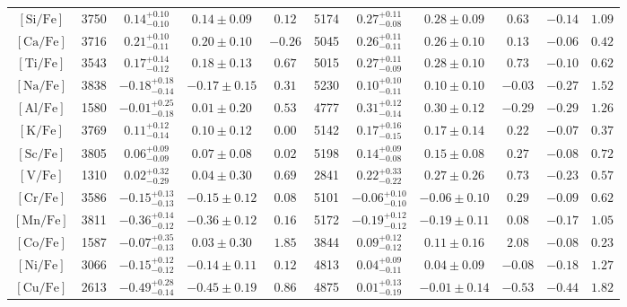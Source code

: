\begin{table*}
\begin{tabular}{c|cccc|cccc|cc}
$\mathrm{[Si/Fe]}$ & 3750 & $0.14_{-0.10}^{+0.10}$ & $0.14 \pm 0.09$ & $0.12$ & 5174 & $0.27_{-0.08}^{+0.11}$ & $0.28 \pm 0.09$ & $0.63$ & $-0.14$ & $1.09$  \\
$\mathrm{[Ca/Fe]}$ & 3716 & $0.21_{-0.11}^{+0.10}$ & $0.20 \pm 0.10$ & $-0.26$ & 5045 & $0.26_{-0.11}^{+0.11}$ & $0.26 \pm 0.10$ & $0.13$ & $-0.06$ & $0.42$  \\
$\mathrm{[Ti/Fe]}$ & 3543 & $0.17_{-0.12}^{+0.14}$ & $0.18 \pm 0.13$ & $0.67$ & 5015 & $0.27_{-0.09}^{+0.11}$ & $0.28 \pm 0.10$ & $0.73$ & $-0.10$ & $0.62$  \\
\hline
$\mathrm{[Na/Fe]}$ & 3838 & $-0.18_{-0.14}^{+0.18}$ & $-0.17 \pm 0.15$ & $0.31$ & 5230 & $0.10_{-0.11}^{+0.10}$ & $0.10 \pm 0.10$ & $-0.03$ & $-0.27$ & $1.52$  \\
$\mathrm{[Al/Fe]}$ & 1580 & $-0.01_{-0.18}^{+0.25}$ & $0.01 \pm 0.20$ & $0.53$ & 4777 & $0.31_{-0.14}^{+0.12}$ & $0.30 \pm 0.12$ & $-0.29$ & $-0.29$ & $1.26$  \\
$\mathrm{[K/Fe]}$ & 3769 & $0.11_{-0.14}^{+0.12}$ & $0.10 \pm 0.12$ & $0.00$ & 5142 & $0.17_{-0.15}^{+0.16}$ & $0.17 \pm 0.14$ & $0.22$ & $-0.07$ & $0.37$  \\
\hline
$\mathrm{[Sc/Fe]}$ & 3805 & $0.06_{-0.09}^{+0.09}$ & $0.07 \pm 0.08$ & $0.02$ & 5198 & $0.14_{-0.08}^{+0.09}$ & $0.15 \pm 0.08$ & $0.27$ & $-0.08$ & $0.72$  \\
$\mathrm{[V/Fe]}$ & 1310 & $0.02_{-0.29}^{+0.32}$ & $0.04 \pm 0.30$ & $0.69$ & 2841 & $0.22_{-0.22}^{+0.33}$ & $0.27 \pm 0.26$ & $0.73$ & $-0.23$ & $0.57$  \\
$\mathrm{[Cr/Fe]}$ & 3586 & $-0.15_{-0.13}^{+0.13}$ & $-0.15 \pm 0.12$ & $0.08$ & 5101 & $-0.06_{-0.10}^{+0.10}$ & $-0.06 \pm 0.10$ & $0.29$ & $-0.09$ & $0.62$  \\
$\mathrm{[Mn/Fe]}$ & 3811 & $-0.36_{-0.12}^{+0.14}$ & $-0.36 \pm 0.12$ & $0.16$ & 5172 & $-0.19_{-0.12}^{+0.12}$ & $-0.19 \pm 0.11$ & $0.08$ & $-0.17$ & $1.05$  \\
$\mathrm{[Co/Fe]}$ & 1587 & $-0.07_{-0.13}^{+0.35}$ & $0.03 \pm 0.30$ & $1.85$ & 3844 & $0.09_{-0.12}^{+0.12}$ & $0.11 \pm 0.16$ & $2.08$ & $-0.08$ & $0.23$  \\
$\mathrm{[Ni/Fe]}$ & 3066 & $-0.15_{-0.12}^{+0.12}$ & $-0.14 \pm 0.11$ & $0.12$ & 4813 & $0.04_{-0.11}^{+0.09}$ & $0.04 \pm 0.09$ & $-0.08$ & $-0.18$ & $1.27$  \\
$\mathrm{[Cu/Fe]}$ & 2613 & $-0.49_{-0.14}^{+0.28}$ & $-0.45 \pm 0.19$ & $0.86$ & 4875 & $0.01_{-0.19}^{+0.13}$ & $-0.01 \pm 0.14$ & $-0.53$ & $-0.44$ & $1.82$  \\

\end{tabular}
\end{table*}
